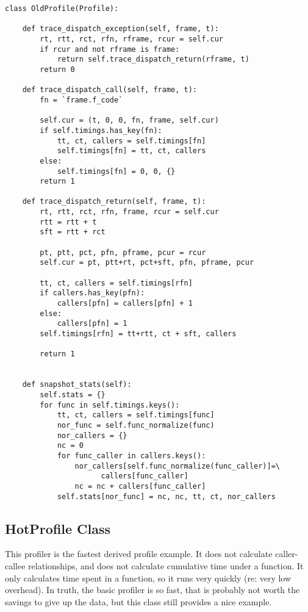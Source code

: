 \bcode\begin{verbatim}
class OldProfile(Profile):

    def trace_dispatch_exception(self, frame, t):
        rt, rtt, rct, rfn, rframe, rcur = self.cur
        if rcur and not rframe is frame:
            return self.trace_dispatch_return(rframe, t)
        return 0

    def trace_dispatch_call(self, frame, t):
        fn = `frame.f_code`
        
        self.cur = (t, 0, 0, fn, frame, self.cur)
        if self.timings.has_key(fn):
            tt, ct, callers = self.timings[fn]
            self.timings[fn] = tt, ct, callers
        else:
            self.timings[fn] = 0, 0, {}
        return 1

    def trace_dispatch_return(self, frame, t):
        rt, rtt, rct, rfn, frame, rcur = self.cur
        rtt = rtt + t
        sft = rtt + rct

        pt, ptt, pct, pfn, pframe, pcur = rcur
        self.cur = pt, ptt+rt, pct+sft, pfn, pframe, pcur

        tt, ct, callers = self.timings[rfn]
        if callers.has_key(pfn):
            callers[pfn] = callers[pfn] + 1
        else:
            callers[pfn] = 1
        self.timings[rfn] = tt+rtt, ct + sft, callers

        return 1


    def snapshot_stats(self):
        self.stats = {}
        for func in self.timings.keys():
            tt, ct, callers = self.timings[func]
            nor_func = self.func_normalize(func)
            nor_callers = {}
            nc = 0
            for func_caller in callers.keys():
                nor_callers[self.func_normalize(func_caller)]=\
                      callers[func_caller]
                nc = nc + callers[func_caller]
            self.stats[nor_func] = nc, nc, tt, ct, nor_callers
\end{verbatim}\ecode
%
\subsection{HotProfile Class}

This profiler is the fastest derived profile example.  It does not
calculate caller-callee relationships, and does not calculate
cumulative time under a function.  It only calculates time spent in a
function, so it runs very quickly (re: very low overhead).  In truth,
the basic profiler is so fast, that is probably not worth the savings
to give up the data, but this class still provides a nice example.

